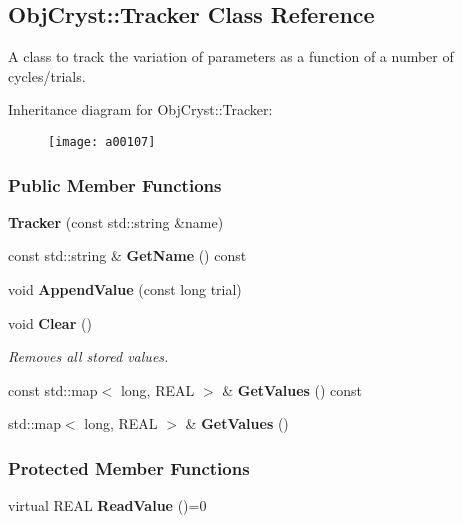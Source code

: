 \subsection{\-Obj\-Cryst\-:\-:\-Tracker \-Class \-Reference}
\label{a00107}


\-A class to track the variation of parameters as a function of a number of cycles/trials.  


\-Inheritance diagram for \-Obj\-Cryst\-:\-:\-Tracker\-:\begin{figure}[H]
\begin{center}
\leavevmode
\texttt{[image: a00107]}
\end{center}
\end{figure}
\subsubsection*{\-Public \-Member \-Functions}
\begin{DoxyCompactItemize}
\item 
{\bfseries \-Tracker} (const std\-::string \&name)\label{a00107_a57d89249ba910902e6ef6a33dcd3ee8c}

\item 
const std\-::string \& {\bfseries \-Get\-Name} () const \label{a00107_ad93197775f7d0a3b52eb199a9ed1c958}

\item 
void {\bfseries \-Append\-Value} (const long trial)\label{a00107_ae50d08700a131d280f8a19a58274bfe7}

\item 
void {\bf \-Clear} ()\label{a00107_abdac1cff42cfd8d66e10977a5a9066b3}

\begin{DoxyCompactList}\small\item\em \-Removes all stored values. \end{DoxyCompactList}\item 
const std\-::map$<$ long, \-R\-E\-A\-L $>$ \& {\bfseries \-Get\-Values} () const \label{a00107_a882fe8d7c193662613d4a9ab262a2417}

\item 
std\-::map$<$ long, \-R\-E\-A\-L $>$ \& {\bfseries \-Get\-Values} ()\label{a00107_a4f889b0d29a403c597040c5b88f4ffa8}

\end{DoxyCompactItemize}
\subsubsection*{\-Protected \-Member \-Functions}
\begin{DoxyCompactItemize}
\item 
virtual \-R\-E\-A\-L {\bfseries \-Read\-Value} ()=0\label{a00107_a14096d99b76d3ffac16553f6434f97ce}

\end{DoxyCompactItemize}
